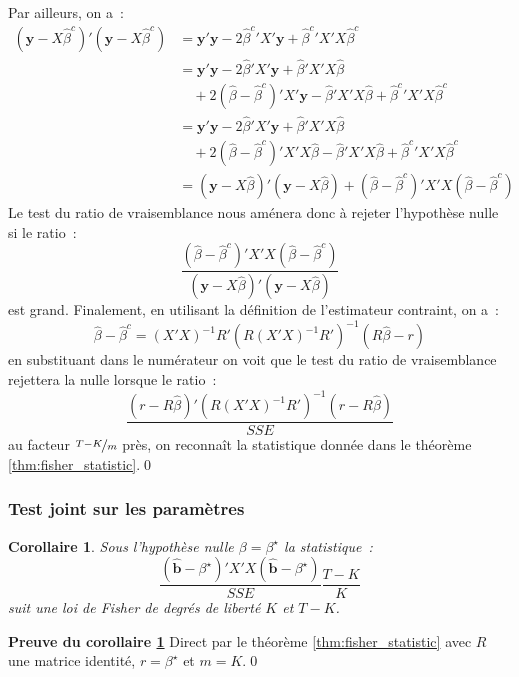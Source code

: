 \documentclass[10pt]{beamer}
\theoremstyle{plain}
\newtheorem{cor}{Corollaire}
\begin{document}
\begin{notes}
  Par ailleurs, on a~:
  \[
    \begin{split}
      \left(\mathbf y - X\hat\beta^c\right)'\left(\mathbf y - X\hat\beta^c\right) &= \mathbf y'\mathbf y - 2\left.\hat\beta^c\right.'X'\mathbf y + \left.\hat\beta^c\right.'X'X \hat\beta^c\\
                                                                                  &= \mathbf y'\mathbf y - 2\hat\beta'X'\mathbf y + \left.\hat\beta\right.'X'X \hat\beta\\ &\quad + 2\left(\hat\beta-\hat\beta^c \right)'X'\mathbf y - \left.\hat\beta\right.'X'X \hat\beta + \left.\hat\beta^c\right.'X'X \hat\beta^c\\
      &= \mathbf y'\mathbf y - 2\hat\beta'X'\mathbf y + \left.\hat\beta\right.'X'X \hat\beta\\ &\quad + 2\left(\hat\beta-\hat\beta^c \right)'X'X\hat\beta - \left.\hat\beta\right.'X'X \hat\beta + \left.\hat\beta^c\right.'X'X \hat\beta^c\\
      &= \left(\mathbf y - X\hat\beta\right)'\left(\mathbf y - X\hat\beta\right) + \left(\hat\beta-\hat\beta^c\right)'X'X\left(\hat\beta-\hat\beta^c\right)
    \end{split}
  \]
  Le test du ratio de vraisemblance nous aménera donc à rejeter l'hypothèse nulle si le ratio~:
  \[
    \frac{\left(\hat\beta-\hat\beta^c\right)'X'X\left(\hat\beta-\hat\beta^c\right)}{\left(\mathbf y - X\hat\beta\right)'\left(\mathbf y - X\hat\beta\right)}
  \]
  est grand. Finalement, en utilisant la définition de l'estimateur contraint, on a~:
  \[
    \hat\beta - \hat\beta^c = (X'X)^{-1}R'\left( R(X'X)^{-1}R' \right)^{-1}\left( R\hat{\beta}-r \right)
  \]
  en substituant dans le numérateur on voit que le test du ratio de vraisemblance rejettera la nulle lorsque le ratio~:
  \[
    \frac{\left(r-R\hat{\beta}\right)'\left( R(X'X)^{-1}R' \right)^{-1}\left(r-R\hat{\beta}\right)}{SSE}
  \]
  au facteur $\nicefrac{T-K}{m}$ près, on reconnaît la statistique donnée dans le théorème \ref{thm:fisher_statistic}.\qed

\end{notes}


\begin{frame}
  \frametitle{Test joint sur les paramètres}

  \begin{cor}\label{cor:equality_test}
    Sous l'hypothèse nulle $\beta = \beta^{\star}$ la statistique~:
    \[
      \frac{\left(\hat{\mathbf b}-\beta^{\star}\right)'X'X\left(\hat{\mathbf b}-\beta^{\star}\right)}{SSE}\frac{T-K}{K}
    \]
    suit une loi de Fisher de degrés de liberté $K$ et $T-K$.
  \end{cor}

  \bigskip\bigskip

  \textbf{Preuve du corollaire \ref{cor:equality_test}} Direct par le théorème \ref{thm:fisher_statistic} avec $R$ une matrice identité, $r=\beta^{\star}$ et $m=K$.\qed

\end{frame}
\end{document}
